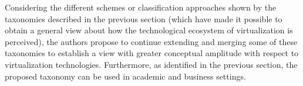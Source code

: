 	Considering the different schemes or classification approaches shown by the taxonomies described in the previous section (which have made it possible to obtain a general view about how the technological ecosystem of virtualization is perceived), the authors propose to continue extending and merging some of these taxonomies to establish a view with greater conceptual amplitude with respect to virtualization technologies. Furthermore, as identified in the previous section, the proposed taxonomy can be used in academic and business settings.
	
	
	
	

